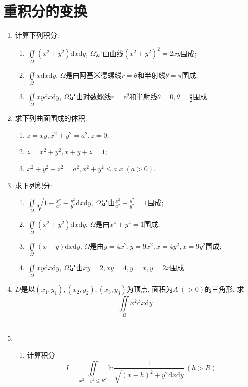 \section{重积分的变换}
\begin{enumerate}
	\item 计算下列积分:
	\begin{enumerate}
		\item $\displaystyle{\underset{\Omega}{\iint}(x^2+y^2)\mathrm{d}x\mathrm{d}y}$, $\Omega$是由曲线$(x^2+y^2)^2=2xy$围成;
		\item $\displaystyle{\underset{\Omega}{\iint}x\mathrm{d}x\mathrm{d}y}$, $\Omega$是由阿基米德螺线$r=\theta$和半射线$\theta=\pi$围成;
		\item $\displaystyle{\underset{\Omega}{\iint}xy\mathrm{d}x\mathrm{d}y}$, $\Omega$是由对数螺线$r=\mathrm{e}^\theta$和半射线$\theta = 0, \theta=\frac{\pi}{2}$围成.
	\end{enumerate}
\item 求下列曲面围成的体积:
\begin{enumerate}
	\item $z=xy,x^2+y^2=a^2,z=0$;
	\item $z=x^2+y^2,x+y+z=1$;
	\item $x^2+y^2+z^2=a^2,x^2+y^2\le a|x|(a>0)$.
\end{enumerate}
\item 求下列积分:
\begin{enumerate}
	\item $\displaystyle{\underset{\Omega}{\iint}\sqrt{1-\frac{x^2}{a^2}-\frac{y^2}{b^2}}\mathrm{d}x\mathrm{d}y}$, $\Omega$是由$\frac{x^2}{a^2}+\frac{y^2}{b^2}=1$围成;
	\item $\displaystyle{\underset{\Omega}{\iint}(x^2+y^2)\mathrm{d}x\mathrm{d}y}$, $\Omega$是由$x^4+y^4=1$围成;
	\item $\displaystyle{\underset{\Omega}{\iint}(x+y)\mathrm{d}x\mathrm{d}y}$, $\Omega$是由$y=4x^2,y=9x^2,x=4y^2,x=9y^2$围成;
	\item  $\displaystyle{\underset{\Omega}{\iint}xy\mathrm{d}x\mathrm{d}y}$, $\Omega$是由$xy=2,xy=4,y=x,y=2x$围成.
\end{enumerate}
\item $D$是以$(x_1,y_1),(x_2,y_2),(x_3,y_3)$为顶点, 面积为$A\ (>0)$的三角形, 求
$$\underset{\Omega}{\iint}x^2\mathrm{d}x\mathrm{d}y$$.
\item 
\begin{enumerate}
	\item 计算积分$$ I = \displaystyle{\underset{x^2+y^2\le R^2}{\iint}\mathrm{ln}\frac{1}{\sqrt{(x-h)^2+y^2}\mathrm{d}x\mathrm{d}y}\ (h>R)}$$

\end{enumerate}
\end{enumerate}
